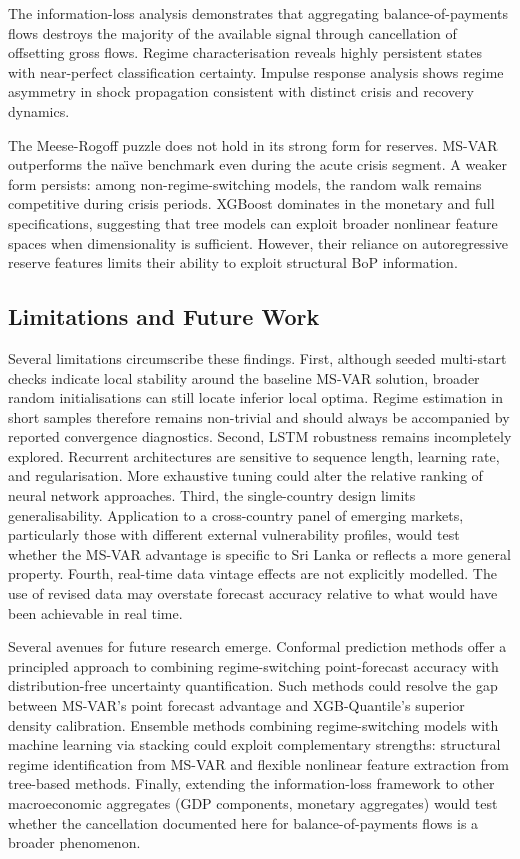 \documentclass[12pt,a4paper]{article}
\begin{document}
The information-loss analysis demonstrates that aggregating balance-of-payments flows destroys the majority of the available signal through cancellation of offsetting gross flows. Regime characterisation reveals highly persistent states with near-perfect classification certainty. Impulse response analysis shows regime asymmetry in shock propagation consistent with distinct crisis and recovery dynamics.

The Meese-Rogoff puzzle does not hold in its strong form for reserves. MS-VAR outperforms the na\"{\i}ve benchmark even during the acute crisis segment. A weaker form persists: among non-regime-switching models, the random walk remains competitive during crisis periods. XGBoost dominates in the monetary and full specifications, suggesting that tree models can exploit broader nonlinear feature spaces when dimensionality is sufficient. However, their reliance on autoregressive reserve features limits their ability to exploit structural BoP information.

\subsection{Limitations and Future Work}

Several limitations circumscribe these findings. First, although seeded multi-start checks indicate local stability around the baseline MS-VAR solution, broader random initialisations can still locate inferior local optima. Regime estimation in short samples therefore remains non-trivial and should always be accompanied by reported convergence diagnostics. Second, LSTM robustness remains incompletely explored. Recurrent architectures are sensitive to sequence length, learning rate, and regularisation. More exhaustive tuning could alter the relative ranking of neural network approaches. Third, the single-country design limits generalisability. Application to a cross-country panel of emerging markets, particularly those with different external vulnerability profiles, would test whether the MS-VAR advantage is specific to Sri Lanka or reflects a more general property. Fourth, real-time data vintage effects are not explicitly modelled. The use of revised data may overstate forecast accuracy relative to what would have been achievable in real time.

Several avenues for future research emerge. Conformal prediction methods offer a principled approach to combining regime-switching point-forecast accuracy with distribution-free uncertainty quantification. Such methods could resolve the gap between MS-VAR's point forecast advantage and XGB-Quantile's superior density calibration. Ensemble methods combining regime-switching models with machine learning via stacking could exploit complementary strengths: structural regime identification from MS-VAR and flexible nonlinear feature extraction from tree-based methods. Finally, extending the information-loss framework to other macroeconomic aggregates (GDP components, monetary aggregates) would test whether the cancellation documented here for balance-of-payments flows is a broader phenomenon.
\end{document}
